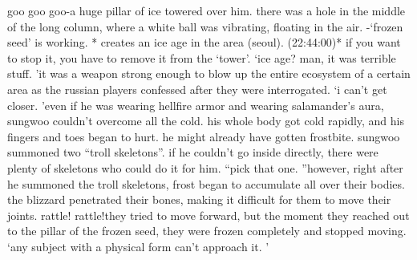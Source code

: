 goo goo goo-a huge pillar of ice towered over him.
 there was a hole in the middle of the long column, where a white ball was vibrating, floating in the air.
-‘frozen seed’ is working.
* creates an ice age in the area (seoul).
 (22:44:00)* if you want to stop it, you have to remove it from the ‘tower’.
‘ice age? man, it was terrible stuff.
’it was a weapon strong enough to blow up the entire ecosystem of a certain area as the russian players confessed after they were interrogated.
‘i can’t get closer.
’even if he was wearing hellfire armor and wearing salamander’s aura, sungwoo couldn’t overcome all the cold.
 his whole body got cold rapidly, and his fingers and toes began to hurt.
 he might already have gotten frostbite.
sungwoo summoned two “troll skeletons”.
 if he couldn’t go inside directly, there were plenty of skeletons who could do it for him.
“pick that one.
”however, right after he summoned the troll skeletons, frost began to accumulate all over their bodies.
 the blizzard penetrated their bones, making it difficult for them to move their joints.
rattle! rattle!they tried to move forward, but the moment they reached out to the pillar of the frozen seed, they were frozen completely and stopped moving.
‘any subject with a physical form can’t approach it.
’

 